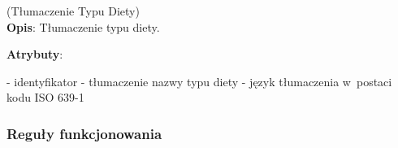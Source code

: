 \begin{enumerate}[label={\textbf{KAT/2/\protect\twodigits{\theenumi}}}, wide, labelwidth=!, labelindent=0pt, labelsep=0pt, series=reqs]
    \label{kat:DietTypeTranslation} (Tłumaczenie Typu Diety)\\
    \indent\textbf{Opis}: Tłumaczenie typu diety.
    \par
    \textbf{Atrybuty}:
    \begin{itemize}[series=atr, wide, align=left, leftmargin=190pt]
        \label{kat:DietTypeTranslation:id}- identyfikator
        \label{kat:DietTypeTranslation:translation}- tłumaczenie nazwy typu diety
        \label{kat:DietTypeTranslation:language}- język tłumaczenia w~postaci kodu ISO 639-1
    \end{itemize}

\end{enumerate}

\subsubsection{Reguły funkcjonowania}\label{subsubsec:database:products:functionalRules}

